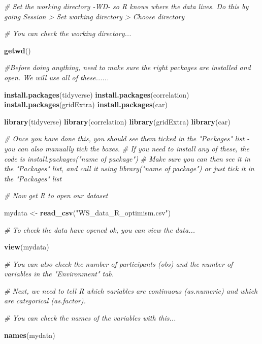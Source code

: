 \documentclass[
]{book}
\newenvironment{Shaded}{\begin{snugshade}}{\end{snugshade}}
\newcommand{\CommentTok}[1]{\textcolor[rgb]{0.56,0.35,0.01}{\textit{#1}}}
\newcommand{\FunctionTok}[1]{\textcolor[rgb]{0.13,0.29,0.53}{\textbf{#1}}}
\newcommand{\NormalTok}[1]{#1}
\newcommand{\OtherTok}[1]{\textcolor[rgb]{0.56,0.35,0.01}{#1}}
\newcommand{\StringTok}[1]{\textcolor[rgb]{0.31,0.60,0.02}{#1}}
\begin{document}
\begin{Shaded}
\begin{Highlighting}[]
\CommentTok{\# Set the working directory {-}WD{-} so R knows where the data lives. Do this by going Session \textgreater{} Set working directory \textgreater{} Choose directory}

\CommentTok{\# You can check the working directory...}

\FunctionTok{getwd}\NormalTok{()}

\CommentTok{\#Before doing anything, need to make sure the right packages are installed and open. We will use all of these......}

\FunctionTok{install.packages}\NormalTok{(tidyverse)}
\FunctionTok{install.packages}\NormalTok{(correlation)}
\FunctionTok{install.packages}\NormalTok{(gridExtra)}
\FunctionTok{install.packages}\NormalTok{(car)}

\FunctionTok{library}\NormalTok{(tidyverse)}
\FunctionTok{library}\NormalTok{(correlation)}
\FunctionTok{library}\NormalTok{(gridExtra)}
\FunctionTok{library}\NormalTok{(car)}

\CommentTok{\# Once you have done this, you should see them ticked in the "Packages" list {-} you can also manually tick the boxes.}
\CommentTok{\# If you need to install any of these, the code is install.packages("name of package")}
\CommentTok{\# Make sure you can then see it in the "Packages" list, and call it using library("name of package") or just tick it in the "Packages" list}

\CommentTok{\# Now get R to open our dataset}

\NormalTok{mydata }\OtherTok{\textless{}{-}} \FunctionTok{read\_csv}\NormalTok{(}\StringTok{"WS\_data\_R\_optimism.csv"}\NormalTok{)}

\CommentTok{\# To check the data have opened ok, you can view the data...}

\FunctionTok{view}\NormalTok{(mydata)}

\CommentTok{\# You can also check the number of participants (obs) and the number of variables in the "Environment" tab.}

\CommentTok{\# Next, we need to tell R which variables are continuous (as.numeric) and which are categorical (as.factor).}

\CommentTok{\# You can check the names of the variables with this...}

\FunctionTok{names}\NormalTok{(mydata)}


\end{Highlighting}
\end{Shaded}
\end{document}
